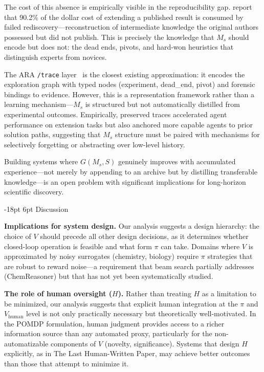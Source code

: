 \documentclass[11pt]{article}
\makeatletter
\renewcommand\section{\@startsection{section}{1}{\z@}%
  {-18pt \@plus -4pt \@minus -2pt}%
  {6pt \@plus 2pt}%
  {\normalfont\large\bfseries}}
\makeatother
\begin{document}
The cost of this absence is empirically visible in the reproducibility gap. \citet{liu2026lasthuman} report that 90.2\% of the dollar cost of extending a published result is consumed by failed rediscovery---reconstruction of intermediate knowledge the original authors possessed but did not publish. This is precisely the knowledge that $M_s$ should encode but does not: the dead ends, pivots, and hard-won heuristics that distinguish experts from novices.

The ARA \texttt{/trace} layer~\citep{liu2026lasthuman} is the closest existing approximation: it encodes the exploration graph with typed nodes (experiment, dead\_end, pivot) and forensic bindings to evidence. However, this is a representation framework rather than a learning mechanism---$M_s$ is structured but not automatically distilled from experimental outcomes. Empirically, preserved traces accelerated agent performance on extension tasks but also anchored more capable agents to prior solution paths, suggesting that $M_s$ structure must be paired with mechanisms for selectively forgetting or abstracting over low-level history.

Building systems where $G(M_s, S)$ genuinely improves with accumulated experience---not merely by appending to an archive but by distilling transferable knowledge---is an open problem with significant implications for long-horizon scientific discovery.

\section{Discussion}
\label{sec:discussion}

\textbf{Implications for system design.} Our analysis suggests a design hierarchy: the choice of $V$ should precede all other design decisions, as it determines whether closed-loop operation is feasible and what form $\pi$ can take. Domains where $V$ is approximated by noisy surrogates (chemistry, biology) require $\pi$ strategies that are robust to reward noise---a requirement that beam search partially addresses (ChemReasoner) but that has not yet been systematically studied.

\textbf{The role of human oversight ($H$).} Rather than treating $H$ as a limitation to be minimized, our analysis suggests that explicit human integration at the $\pi$ and $V_\text{human}$ level is not only practically necessary but theoretically well-motivated. In the POMDP formulation, human judgment provides access to a richer information source than any automated proxy, particularly for the non-automatizable components of $V$ (novelty, significance). Systems that design $H$ explicitly, as in The Last Human-Written Paper, may achieve better outcomes than those that attempt to minimize it.
\end{document}
